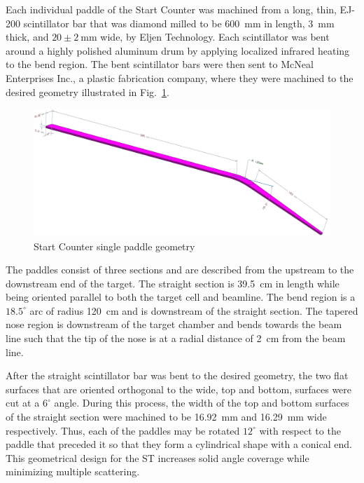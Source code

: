 Each individual paddle of the Start Counter was machined from a long, thin,  EJ-200 scintillator bar that was diamond milled to be 600~mm in length, 3~mm thick, and $\mathrm{20 \pm 2\ mm}$ wide, by Eljen Technology.  Each scintillator was bent around a highly polished aluminum drum by applying localized infrared heating to the bend region.  The bent scintillator bars were then sent to McNeal Enterprises Inc.\cite{mcneal}, a plastic fabrication company, where they were machined to the desired geometry illustrated in Fig.~\ref{fig:stpaddleiso}.
	\begin{figure}[!htb]
		\centering
		\includegraphics[width=1.0\columnwidth]{design/figs/st_paddle_iso}
		\caption{Start Counter single paddle geometry}
		\label{fig:stpaddleiso}
	\end{figure}

The paddles consist of three sections and are described from the upstream to the downstream end of the target.  The straight section is 39.5~cm in length while being oriented parallel to both the target cell and beamline.  The bend region is a $18.5^{\circ}$ arc of radius 120~cm and is downstream of the straight section. The tapered nose region is downstream of the target chamber and bends towards the beam line such that the tip of the nose is at a radial distance of 2~cm from the beam line.  

After the straight scintillator bar was bent to the desired geometry, the two flat surfaces that are oriented orthogonal to the wide, top and bottom, surfaces were cut at a $6^{\circ}$ angle.  During this process, the width of the top and bottom surfaces of the straight section were machined to be 16.92~mm and 16.29~mm wide respectively. Thus, each of the paddles may be rotated $12^{\circ}$ with respect to the paddle that preceded it so that they form a cylindrical shape with a conical end.  This geometrical design for the ST increases solid angle coverage while minimizing multiple scattering.  

